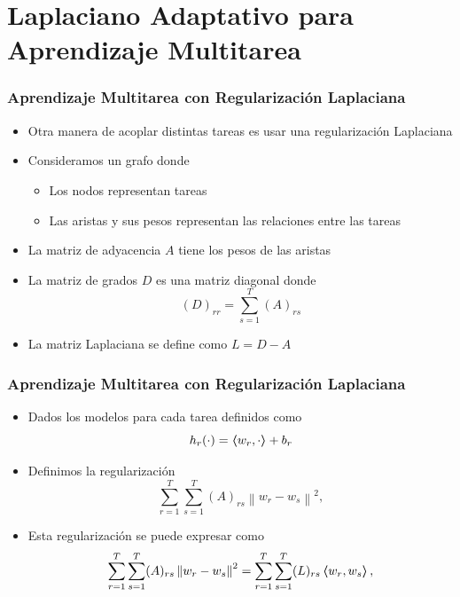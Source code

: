 \documentclass{beamer}
\newcommand{\norm}[1]{\left\lVert#1\right\rVert}
\newcommand{\hypf}{h}
\newcommand{\dotp}[2]{\bm{\left\langle} #1, #2 \bm{\right\rangle}}
\newcommand{\ntasks}{T}
\begin{document}
\section{Laplaciano Adaptativo para Aprendizaje Multitarea}

\begin{frame}
      \frametitle{Aprendizaje Multitarea con Regularización Laplaciana}

      \begin{itemize}
            \item Otra manera de acoplar distintas tareas es usar una regularización Laplaciana
            \item Consideramos un grafo donde
            \begin{itemize}
                  \item Los nodos representan tareas
                  \item Las aristas y sus pesos representan las relaciones entre las tareas
            \end{itemize}
            \item La matriz de adyacencia $A$ tiene los pesos de las aristas
            \item La matriz de grados $D$ es una matriz diagonal donde
            $$ (D)_{rr} = \sum_{s=1}^\ntasks (A)_{rs}$$
            \item La matriz Laplaciana se define como $L = D - A$
      \end{itemize}
      
\end{frame}


\begin{frame}
      \frametitle{Aprendizaje Multitarea con Regularización Laplaciana}

      \begin{itemize}
            \item Dados los modelos para cada tarea definidos como
            $$ \hypf_r(\cdot) = \dotp{w_r}{\cdot} + b_r$$
            \item Definimos la regularización
            \begin{equation}
                  \nonumber
                  \sum_{r=1}^\ntasks \sum_{s=1}^\ntasks (A)_{rs} \norm{w_r - w_s}^2 ,
              \end{equation}
            \item Esta regularización se puede expresar como
            \begin{equation}
                  \nonumber
                  \sum_{r=1}^\ntasks \sum_{s=1}^\ntasks (A)_{rs} \norm{w_r - w_s}^2 = \sum_{r=1}^\ntasks \sum_{s=1}^\ntasks (L)_{rs} \dotp{w_r}{w_s} ,
              \end{equation}
      \end{itemize}
      
\end{frame}
\end{document}

